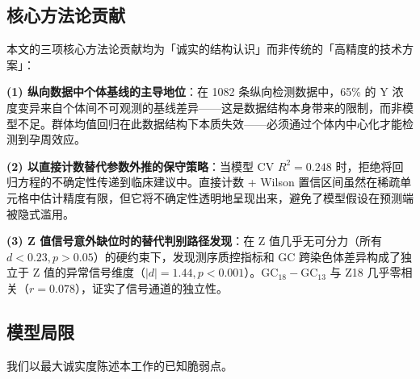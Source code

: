 \documentclass{mcm-paper}
\begin{document}
\subsection{核心方法论贡献}

本文的三项核心方法论贡献均为「诚实的结构认识」而非传统的「高精度的技术方案」：

\textbf{(1) 纵向数据中个体基线的主导地位}：在 1082 条纵向检测数据中，65\% 的 Y 浓度变异来自个体间不可观测的基线差异——这是数据结构本身带来的限制，而非模型不足。群体均值回归在此数据结构下本质失效——必须通过个体内中心化才能检测到孕周效应。

\textbf{(2) 以直接计数替代参数外推的保守策略}：当模型 CV $R^2=0.248$ 时，拒绝将回归方程的不确定性传递到临床建议中。直接计数 + Wilson 置信区间虽然在稀疏单元格中估计精度有限，但它将不确定性透明地呈现出来，避免了模型假设在预测端被隐式滥用。

\textbf{(3) Z 值信号意外缺位时的替代判别路径发现}：在 Z 值几乎无可分力（所有 $d<0.23, p>0.05$）的硬约束下，发现测序质控指标和 GC 跨染色体差异构成了独立于 Z 值的异常信号维度（$|d|=1.44, p<0.001$）。GC$_{18}-$GC$_{13}$ 与 Z18 几乎零相关（$r=0.078$），证实了信号通道的独立性。

\subsection{模型局限}

我们以最大诚实度陈述本工作的已知脆弱点。
\end{document}
